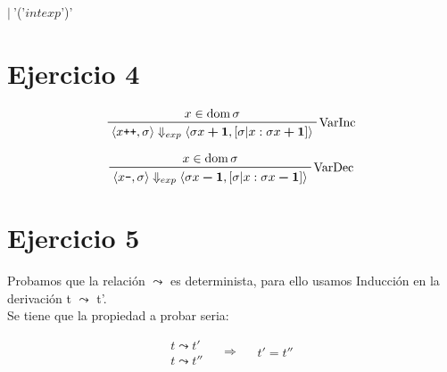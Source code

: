 \documentclass[12pt, titlepage]{article}
\newcommand{\pp}{\texttt{++}}
\newcommand{\mm}{\texttt{--}}
\begin{document}
\hspace{1.5cm}$|\: $'('$ intexp $')'


\section{Ejercicio 4}
\begin{displaymath}   
    \prftree[r]{VarInc}{x \in \operatorname{dom} \sigma} {\langle x \pp,\sigma \rangle \Downarrow_{exp} \langle \sigma x \bm{+} \bm{1}, [\sigma| x : \sigma x \bm{+} \bm{1}] \rangle}
\end{displaymath}

\begin{displaymath}   
    \prftree[r]{VarDec}{x \in \operatorname{dom} \sigma} {\langle x \mm,\sigma \rangle \Downarrow_{exp} \langle \sigma x \bm{-} \bm{1}, [\sigma| x : \sigma x \bm{-} \bm{1}] \rangle}
\end{displaymath}


\section{Ejercicio 5}
Probamos que la relación $\leadsto$ es determinista, para ello usamos Inducción en la derivación t $\leadsto$ t'.\\
Se tiene que la propiedad a probar seria:  

\begin{equation*}
\begin{aligned}
    t \leadsto t'\\
    t \leadsto t''
\end{aligned}
\quad \Rightarrow \quad
\begin{aligned}
    t' = t''
\end{aligned}
\end{equation*}
\end{document}
